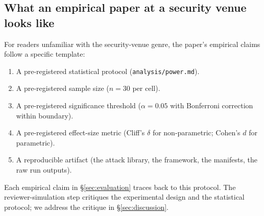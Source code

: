 \subsection{What an empirical paper at a security venue looks like}

For readers unfamiliar with the security-venue genre, the
paper's empirical claims follow a specific template:

\begin{enumerate}
  \item A pre-registered statistical protocol
        (\texttt{analysis/power.md}).
  \item A pre-registered sample size ($n = 30$ per cell).
  \item A pre-registered significance threshold
        ($\alpha = 0.05$ with Bonferroni correction within
        boundary).
  \item A pre-registered effect-size metric (Cliff's $\delta$
        for non-parametric; Cohen's $d$ for parametric).
  \item A reproducible artifact (the attack library, the
        framework, the manifests, the raw run outputs).
\end{enumerate}

Each empirical claim in \S\ref{sec:evaluation} traces back to
this protocol. The reviewer-simulation step
critiques the experimental design and the statistical
protocol; we address the critique in \S\ref{sec:discussion}.